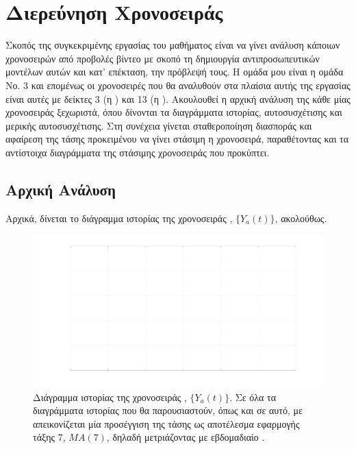 \chapter{Διερεύνηση Χρονοσειράς }
\label{ch:step1}
\setcounter{page}{1}
\thispagestyle{fancy}

Σκοπός της συγκεκριμένης εργασίας του μαθήματος  είναι να γίνει ανάλυση κάποιων χρονοσειρών από προβολές βίντεο με σκοπό τη δημιουργία αντιπροσωπευτικών μοντέλων αυτών και κατ' επέκταση, την πρόβλεψή τους. Η ομάδα μου είναι η ομάδα Νο. 3 και επομένως οι χρονοσειρές που θα αναλυθούν στα πλαίσια αυτής της εργασίας είναι αυτές με δείκτες 3 (η ) και 13 (η ). Ακουλουθεί η αρχική ανάλυση της κάθε μίας χρονοσειράς ξεχωριστά, όπου δίνονται τα διαγράμματα ιστορίας, αυτοσυσχέτισης και μερικής αυτοσυσχέτισης. Στη συνέχεια γίνεται σταθεροποίηση διασποράς και αφαίρεση της τάσης προκειμένου να γίνει στάσιμη η χρονοσειρά, παραθέτοντας και τα αντίστοιχα διαγράμματα της στάσιμης χρονοσειράς που προκύπτει.  

\section{Αρχική Ανάλυση}

Αρχικά, δίνεται το διάγραμμα ιστορίας της χρονοσειράς , $\{Y_a(t)\}$, ακολούθως.

\begin{figure}[H]
    \begin{center}
        \includegraphics[width=\textwidth]{plots/ya_history.svg.pdf}
        \caption{Διάγραμμα ιστορίας της χρονοσειράς , $\{Y_a(t)\}$. Σε όλα τα διαγράμματα ιστορίας που θα παρουσιαστούν, όπως και σε αυτό, με  απεικονίζεται μία προσέγγιση της τάσης ως αποτέλεσμα εφαρμογής  τάξης 7, $MA(7)$, δηλαδή μετριάζοντας με εβδομαδιαίο .}
        \label{fig:ya_history}
    \end{center}
\end{figure}

